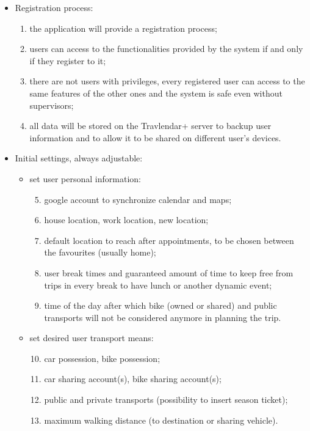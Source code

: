 \begin{itemize}
\item	Registration process:
\begin{enumerate}
\item the application will provide a registration process;
\item users can access to the functionalities provided by the system if and only if they register to it;
\item there are not users with privileges, every registered user can access to the same features of the other ones and the system is safe even without supervisors;
\item all data will be stored on the Travlendar+ server to backup user information and to allow it to be shared on different user’s devices.
\end{enumerate}
\item	Initial settings, always adjustable:
\begin{itemize}
\item set user personal information: 
\begin{enumerate}
	\setcounter{enumi}{4}
\item google account to synchronize calendar and maps;
\item house location, work location, new location;
\item default location to reach after appointments, to be chosen between the favourites (usually home);
\item user break times and guaranteed amount of time to keep free from trips in every break to have lunch or another dynamic event;
\item time of the day after which bike (owned or shared) and public transports will not be considered anymore in planning the trip.
\end{enumerate} 
\item set desired user transport means: 
\begin{enumerate}
  \setcounter{enumi}{9}
\item car possession, bike possession; 
\item car sharing account(s), bike sharing account(s);
\item public and private transports (possibility to insert season ticket);
\item maximum walking distance (to destination or sharing vehicle).
\end{enumerate}
\end{itemize}


\end{itemize}
